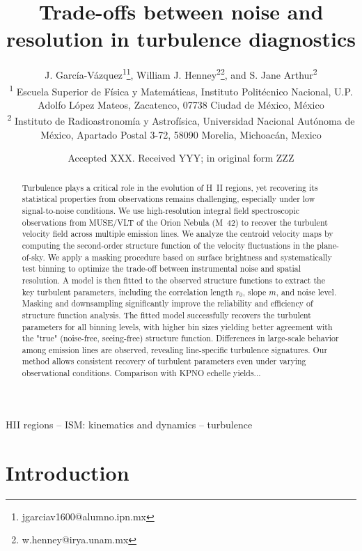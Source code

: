 \documentclass[fleqn,usenatbib, useAMS, a4paper]{mnras}
\title[Turbulence diagnostic trade-offs]{Trade-offs between noise and resolution in turbulence diagnostics}
\author[J. García-Vázquez et al.]{
  J. García-Vázquez\textsuperscript{1}\thanks{jgarciav1600@alumno.ipn.mx},
  William J. Henney\textsuperscript{2}\thanks{w.henney@irya.unam.mx},
  and S. Jane Arthur\textsuperscript{2}
  \\
  \textsuperscript{1}\foreignlanguage{spanish}{%
    Escuela Superior de Física y Matemáticas, Instituto Politécnico Nacional, U.P. Adolfo López Mateos, Zacatenco, 07738 Ciudad de México, México}\\
  \textsuperscript{2}\foreignlanguage{spanish}{%
    Instituto de Radioastronomía y
    Astrofísica, Universidad Nacional Autónoma de México, Apartado
    Postal 3-72, 58090 Morelia, Michoacán, Mexico}\\
}
\date{Accepted XXX. Received YYY; in original form ZZZ}
\begin{document}
\label{firstpage}
\pagerange{\pageref{firstpage}--\pageref{lastpage}}
\maketitle

\begin{abstract}
  Turbulence plays a critical role in the evolution of H~II regions, yet recovering its statistical properties from observations remains challenging, especially under low signal-to-noise conditions.
  We use high-resolution integral field spectroscopic observations from MUSE/VLT of the Orion Nebula (M~42) to recover the turbulent velocity field across multiple emission lines.
  We analyze the centroid velocity maps by computing the second-order structure function of the velocity fluctuations in the plane-of-sky. We apply a masking procedure based on surface brightness and systematically test binning to optimize the trade-off between instrumental noise and spatial resolution. A model is then fitted to the observed structure functions to extract the key turbulent parameters, including the correlation length $r_0$, slope $m$, and noise level.
  Masking and downsampling significantly improve the reliability and efficiency of structure function analysis. The fitted model successfully recovers the turbulent parameters for all binning levels, with higher bin sizes yielding better agreement with the "true" (noise-free, seeing-free) structure function. Differences in large-scale behavior among emission lines are observed, revealing line-specific turbulence signatures. Our method allows consistent recovery of turbulent parameters even under varying observational conditions. Comparison with KPNO echelle yields...
\end{abstract}

\begin{keywords}
HII regions -- ISM: kinematics and dynamics -- turbulence 
\end{keywords}




\section{Introduction}
\end{document}

